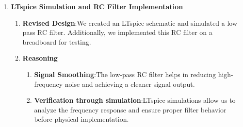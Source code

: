 \documentclass[12pt,a4paper]{article}
\begin{document}
\begin{enumerate}
\begin{enumerate}
\end{enumerate}

\item \textbf{LTspice Simulation and RC Filter Implementation}
\begin{enumerate}
\item \textbf{Revised Design}:We created an LTspice schematic and simulated a low-pass RC filter. Additionally, we implemented this RC filter on a breadboard for testing.

\item \textbf{Reasoning}
\begin{enumerate}
\item \textbf{Signal Smoothing}:The low-pass RC filter helps in reducing high-frequency noise and achieving a cleaner signal output.


\item \textbf{Verification through simulation}:LTspice simulations allow us to analyze the frequency response and ensure proper filter behavior before physical implementation.




\end{enumerate}
\end{enumerate}
\end{enumerate}
\end{document}

